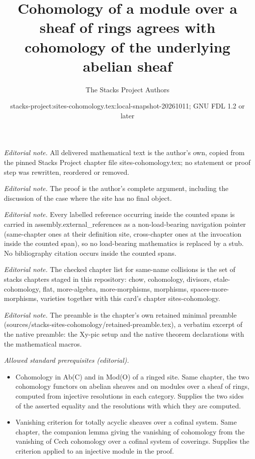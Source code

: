 \documentclass[10pt,a4paper]{amsart}
\title{Cohomology of a module over a sheaf of rings agrees with cohomology of the underlying abelian sheaf}
\author{The Stacks Project Authors}
\date{stacks-project:sites-cohomology.tex:local-snapshot-20261011; GNU FDL 1.2 or later}
\theoremstyle{plain}
\theoremstyle{definition}
\theoremstyle{remark}
\numberwithin{equation}{subsection}
\begin{document}
\maketitle
\noindent\textit{Editorial note.} All delivered mathematical text is the author's own, copied from the pinned Stacks Project chapter file sites-cohomology.tex; no statement or proof step was rewritten, reordered or removed.\par\medskip
\noindent\textit{Editorial note.} The proof is the author's complete argument, including the discussion of the case where the site has no final object.\par\medskip
\noindent\textit{Editorial note.} Every labelled reference occurring inside the counted spans is carried in assembly.external\_references as a non-load-bearing navigation pointer (same-chapter ones at their definition site, cross-chapter ones at the invocation inside the counted span), so no load-bearing mathematics is replaced by a stub. No bibliography citation occurs inside the counted spans.\par\medskip
\noindent\textit{Editorial note.} The checked chapter list for same-name collisions is the set of stacks chapters staged in this repository: chow, cohomology, divisors, etale-cohomology, flat, more-algebra, more-morphisms, morphisms, spaces-more-morphisms, varieties together with this card's chapter sites-cohomology.\par\medskip
\noindent\textit{Editorial note.} The preamble is the chapter's own retained minimal preamble (sources/stacks-sites-cohomology/retained-preamble.tex), a verbatim excerpt of the native preamble: the Xy-pic setup and the native theorem declarations with the mathematical macros.\par\medskip
\noindent\textit{Allowed standard prerequisites (editorial).}\begin{itemize}
\item Cohomology in Ab(C) and in Mod(O) of a ringed site. Same chapter, the two cohomology functors on abelian sheaves and on modules over a sheaf of rings, computed from injective resolutions in each category. Supplies the two sides of the asserted equality and the resolutions with which they are computed.
\item Vanishing criterion for totally acyclic sheaves over a cofinal system. Same chapter, the companion lemma giving the vanishing of cohomology from the vanishing of Cech cohomology over a cofinal system of coverings. Supplies the criterion applied to an injective module in the proof.
\end{itemize}\medskip
\end{document}

